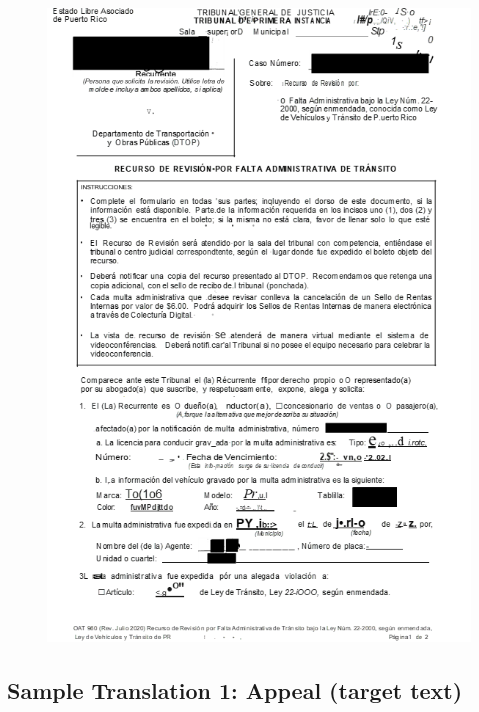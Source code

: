 \documentclass{article}
\begin{document}
\begin{figure}[H]
	\centering
	\includegraphics[width=\textwidth]{../sample_translations/source_1_3.png}
\end{figure}

\subsection{Sample Translation 1: Appeal (target text)}
\end{document}
